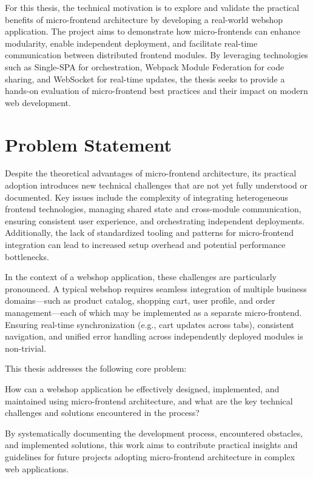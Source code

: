 \documentclass[12pt,a4paper]{report}
\begin{document}
For this thesis, the technical motivation is to explore and validate the practical benefits of micro-frontend architecture by developing a real-world webshop application. The project aims to demonstrate how micro-frontends can enhance modularity, enable independent deployment, and facilitate real-time communication between distributed frontend modules. By leveraging technologies such as Single-SPA for orchestration, Webpack Module Federation for code sharing, and WebSocket for real-time updates, the thesis seeks to provide a hands-on evaluation of micro-frontend best practices and their impact on modern web development.

\section{Problem Statement}
Despite the theoretical advantages of micro-frontend architecture, its practical adoption introduces new technical challenges that are not yet fully understood or documented. Key issues include the complexity of integrating heterogeneous frontend technologies, managing shared state and cross-module communication, ensuring consistent user experience, and orchestrating independent deployments. Additionally, the lack of standardized tooling and patterns for micro-frontend integration can lead to increased setup overhead and potential performance bottlenecks.

In the context of a webshop application, these challenges are particularly pronounced. A typical webshop requires seamless integration of multiple business domains—such as product catalog, shopping cart, user profile, and order management—each of which may be implemented as a separate micro-frontend. Ensuring real-time synchronization (e.g., cart updates across tabs), consistent navigation, and unified error handling across independently deployed modules is non-trivial.

This thesis addresses the following core problem:

How can a webshop application be effectively designed, implemented, and maintained using micro-frontend architecture, and what are the key technical challenges and solutions encountered in the process?

By systematically documenting the development process, encountered obstacles, and implemented solutions, this work aims to contribute practical insights and guidelines for future projects adopting micro-frontend architecture in complex web applications.
\end{document}

